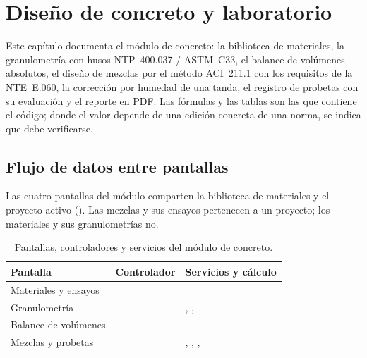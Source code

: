 \section{Diseño de concreto y laboratorio}
\label{sec:con}

Este capítulo documenta el módulo de concreto: la biblioteca de materiales, la granulometría con husos
NTP~400.037 / ASTM~C33, el balance de volúmenes absolutos, el diseño de mezclas por el método ACI~211.1 con los
requisitos de la NTE~E.060, la corrección por humedad de una tanda, el registro de probetas con su evaluación y el
reporte en PDF. Las fórmulas y las tablas son las que contiene el código; donde el valor depende de una edición
concreta de una norma, se indica que debe verificarse.

\subsection{Flujo de datos entre pantallas}
\label{sec:con-flujo}

Las cuatro pantallas del módulo comparten la biblioteca de materiales y el proyecto activo
(). Las mezclas y sus ensayos pertenecen a un proyecto; los materiales y sus granulometrías no.

\begin{table}[H]
	\centering
	\caption{Pantallas, controladores y servicios del módulo de concreto.}
	\label{tab:con-pantallas}
	\begin{tabular}{L{3.2cm}L{3.8cm}L{6.6cm}}
		\hline
		\textbf{Pantalla} & \textbf{Controlador} & \textbf{Servicios y cálculo} \\ \hline
		Materiales y ensayos &  &  \\
		Granulometría &  & , ,
		 \\
		Balance de volúmenes &  &  \\
		Mezclas y probetas &  & , ,
		,  \\
		\hline
	\end{tabular}
\end{table}


